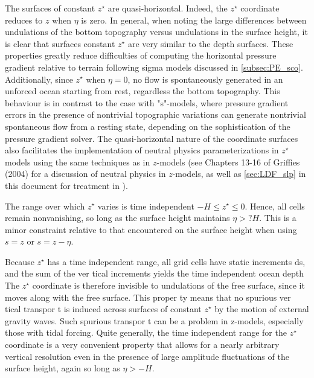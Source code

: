 \documentclass[../main/NEMO_manual]{subfiles}
\begin{document}
The surfaces of constant $z^\star$ are quasi-horizontal.
Indeed, the $z^\star$ coordinate reduces to $z$ when $\eta$ is zero.
In general, when noting the large differences between undulations of the bottom topography versus undulations in
the surface height, it is clear that surfaces constant $z^\star$ are very similar to the depth surfaces.
These properties greatly reduce difficulties of computing the horizontal pressure gradient relative to
terrain following sigma models discussed in \autoref{subsec:PE_sco}. 
Additionally, since $z^\star$ when $\eta = 0$, no flow is spontaneously generated in
an unforced ocean starting from rest, regardless the bottom topography.
This behaviour is in contrast to the case with "s"-models, where pressure gradient errors in the presence of
nontrivial topographic variations can generate nontrivial spontaneous flow from a resting state,
depending on the sophistication of the pressure gradient solver.
The quasi-horizontal nature of the coordinate surfaces also facilitates the implementation of
neutral physics parameterizations in $z^\star$ models using the same techniques as in $z$-models
(see Chapters 13-16 of Griffies (2004) for a discussion of neutral physics in $z$-models,
as well as  \autoref{sec:LDF_slp} in this document for treatment in \NEMO). 

The range over which $z^\star$ varies is time independent $-H \leq z^\star \leq 0$.
Hence, all cells remain nonvanishing, so long as the surface height maintains $\eta > ?H$.
This is a minor constraint relative to that encountered on the surface height when using $s = z$ or $s = z - \eta$. 

Because $z^\star$ has a time independent range, all grid cells have static increments ds,
and the sum of the ver tical increments yields the time independent ocean depth %
The $z^\star$ coordinate is therefore invisible to undulations of the free surface,
since it moves along with the free surface.
This proper ty means that no spurious ver tical transpor t is induced across surfaces of
constant $z^\star$ by the motion of external gravity waves.
Such spurious transpor t can be a problem in z-models, especially those with tidal forcing.
Quite generally, the time independent range for the $z^\star$ coordinate is a very convenient property that
allows for a nearly arbitrary vertical resolution even in the presence of large amplitude fluctuations of
the surface height, again so long as $\eta > -H$. 

\end{document}
